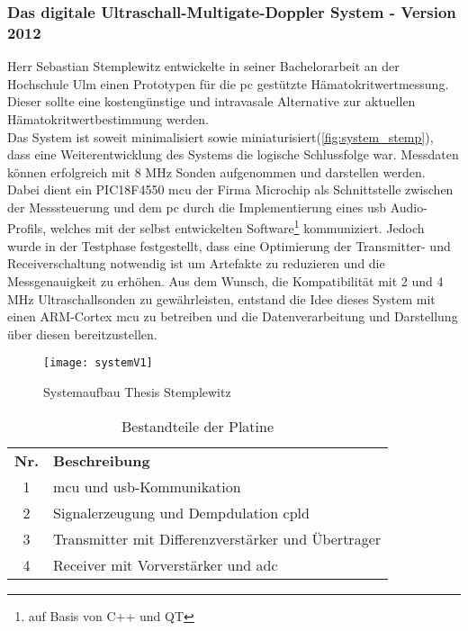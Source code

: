 \subsubsection*{Das digitale Ultraschall-Multigate-Doppler System - Version 2012}\label{cp:usdV1}

Herr Sebastian Stemplewitz entwickelte in seiner Bachelorarbeit an der Hochschule Ulm einen Prototypen für die \ac{pc} gestützte Hämatokritwertmessung. Dieser sollte eine kostengünstige und intravasale Alternative zur aktuellen Hämatokritwertbestimmung werden.\\
Das System ist soweit minimalisiert sowie miniaturisiert(\autoref{fig:system_stemp}), dass eine Weiterentwicklung des Systems die logische Schlussfolge war. Messdaten können erfolgreich mit 8 MHz Sonden aufgenommen und darstellen werden. Dabei dient ein PIC18F4550 \ac{mcu} der Firma Microchip als Schnittstelle zwischen der Messsteuerung und dem \ac{pc} durch die Implementierung eines \ac{usb} Audio-Profils, welches mit der selbst entwickelten Software\footnote{auf Basis von C++ und QT} kommuniziert. Jedoch wurde in der Testphase festgestellt, dass eine Optimierung der Transmitter- und Receiverschaltung notwendig ist um Artefakte zu reduzieren und die Messgenauigkeit zu erhöhen. Aus dem Wunsch, die Kompatibilität mit 2 und 4 MHz Ultraschallsonden zu gewährleisten, entstand die Idee dieses System mit einen ARM-Cortex \ac{mcu} zu betreiben und die Datenverarbeitung und Darstellung über diesen bereitzustellen.\cite{stemp2012}
\newpage
\begin{figure}[h]
\centering
  	\texttt{[image: systemV1]}  
	\caption{Systemaufbau Thesis Stemplewitz}
  	\label{fig:system_stemp}
\end{figure}
\begin{table}[h]
\centering
\caption{Bestandteile der Platine}
\label{tab:system_stemp_tab}
\begin{tabular}{c|l}
\textbf{Nr.} & \textbf{Beschreibung} \\
\cline{1-2}
1 & \ac{mcu} und \ac{usb}-Kommunikation\\ 
2 & Signalerzeugung und Dempdulation \ac{cpld}\\ 
3 & Transmitter mit Differenzverstärker und Übertrager\\ 
4 & Receiver mit Vorverstärker und \ac{adc}\\ 
\end{tabular}
\end{table}

